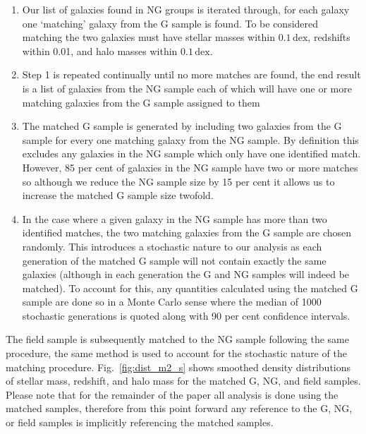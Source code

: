 \documentclass[a4paper,fleqn,usenatbib]{mnras}
\begin{document}
\begin{enumerate}
  \item Our list of galaxies found in NG groups is iterated through,
    for each galaxy one `matching' galaxy from the G sample is
    found.  To be considered matching the two galaxies must have
    stellar masses within $0.1\,\mathrm{dex}$, redshifts within 0.01,
    and halo masses within $0.1\,\mathrm{dex}$.

  \item Step 1 is repeated continually until no more matches are
    found, the end result is a list of galaxies from the NG
    sample each of which will have one or more matching galaxies from
    the G sample assigned to them
  
  \item The matched G sample is generated by including two galaxies
    from the G sample for every one matching galaxy from the NG
    sample.  By definition this excludes any galaxies in the NG
    sample which only have one identified match.  However, 85 per cent
    of galaxies
    in the NG sample have two or more matches so although we reduce
    the NG sample size by 15 per cent it allows us to increase the
    matched G sample size twofold.

  \item In the case where a given galaxy in the NG sample has more
    than two identified matches, the two matching galaxies from the G sample are
    chosen randomly.  This introduces a stochastic nature to our
    analysis as each generation of the matched G sample will not
    contain exactly the same galaxies (although in each generation the
    G and NG samples will indeed be matched).  To account for this, any
    quantities calculated using the matched G sample are done so in a
    Monte Carlo sense where the median of 1000 stochastic generations
    is quoted along with 90 per cent confidence intervals.
\end{enumerate}

\noindent
The field sample is subsequently matched to the NG sample following
the same procedure, the same method is used to account for the
stochastic nature of the matching procedure.  Fig.~\ref{fig:dist_m2_s}
shows smoothed density
distributions of stellar mass, redshift, and halo mass for the matched
G, NG, and field samples.  Please note that for the remainder of the
paper all analysis is done using the matched samples, therefore from
this point forward any reference to the G, NG, or field samples is
implicitly referencing the matched samples.
\end{document}
